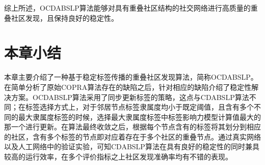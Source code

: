 综上所述，OCDABSLP算法能够对具有重叠社区结构的社交网络进行高质量的重叠社区发现，且保持良好的稳定性。







\section{本章小结}

本章主要介绍了一种基于稳定标签传播的重叠社区发现算法，简称OCDABSLP。在简单分析了原始COPRA算法存在的缺陷之后，针对相应的缺陷介绍了稳定性解决方案。OCDABSLP算法采用了同步更新标签的策略，这点与CDABSLP算法不同；在标签选择方式上，对于邻居节点标签隶属度均小于既定阈值，且含有多个不同的最大隶属度标签的时候，选择最大隶属度标签中标签影响力模型计算值最大的那一个进行更新。在算法最终收敛之后，根据每个节点含有的标签将其划分到相应的社区，含有多个标签的节点即对应着存在于多个社区的重叠节点。通过真实网络以及人工网络中的验证实验，可知CDABSLP算法在具有良好的稳定性的同时兼具较高的运行效率，在多个评价指标之上社区发现准确率均有不错的表现。

